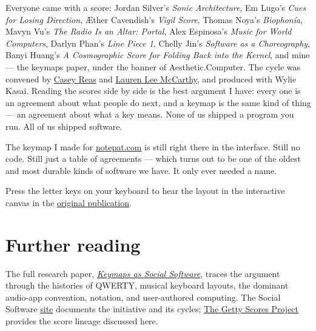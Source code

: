 \documentclass[11pt,letterpaper]{article}
\newcommand{\ac}{Aesthetic\textcolor{acpink}{.}Computer}
\begin{document}
Everyone came with a score: Jordan Silver's \textit{Sonic Architecture}, Em Lugo's \textit{Cues for Losing Direction}, Æther Cavendish's \textit{Vigil Score}, Thomas Noya's \textit{Biophonía}, Mavyn Vu's \textit{The Radio Is an Altar: Portal}, Alex Espinosa's \textit{Music for World Computers}, Darlyn Phan's \textit{Line Piece 1}, Chelly Jin's \textit{Software as a Choreography}, Banyi Huang's \textit{A Cosmographic Score for Folding Back into the Kernel}, and mine --- the keymaps paper, under the banner of \ac{}. The cycle was convened by \href{https://reas.com}{Casey Reas} and \href{https://lauren-mccarthy.com}{Lauren Lee McCarthy}, and produced with Wylie Kasai. Reading the scores side by side is the best argument I have: every one is an agreement about what people do next, and a keymap is the same kind of thing --- an agreement about what a key means. None of us shipped a program you run. All of us shipped software.

The keymap I made for \href{https://notepat.com}{notepat.com} is still right there in the interface. Still no code. Still just a table of agreements --- which turns out to be one of the oldest and most durable kinds of software we have. It only ever needed a name.

Press the letter keys on your keyboard to hear the layout in the interactive canvas in the \href{https://sosoft.arts.ucla.edu/keymaps-as-social-software/}{original publication}.

\section{Further reading}

The full research paper, \href{https://papers.aesthetic.computer/keymaps-social-software-26-arxiv}{\textit{Keymaps as Social Software}}, traces the argument through the histories of QWERTY, musical keyboard layouts, the dominant audio-app convention, notation, and user-authored computing. The Social Software \href{https://sosoft.arts.ucla.edu}{site} documents the initiative and its cycles; \href{https://www.getty.edu/publications/scores/}{The Getty Scores Project} provides the score lineage discussed here.

\end{document}
